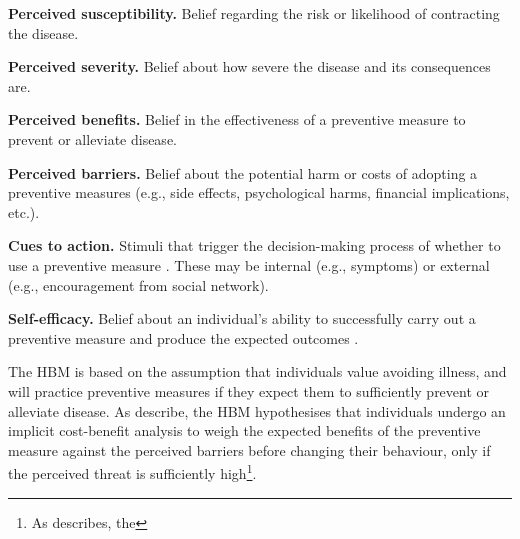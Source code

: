 \begin{description}
    \item \textbf{Perceived susceptibility.} Belief regarding the risk or likelihood of contracting the disease.
    \item \textbf{Perceived severity.} Belief about how severe the disease and its consequences are.
    \item \textbf{Perceived benefits.} Belief in the effectiveness of a preventive measure to prevent or alleviate disease.
    \item \textbf{Perceived barriers.} Belief about the potential harm or costs of adopting a preventive measures (e.g., side effects, psychological harms, financial implications, etc.).
    \item \textbf{Cues to action.} Stimuli that trigger the decision-making process of whether to use a preventive measure \cite{janz_health_1984}. These may be internal (e.g., symptoms) or external (e.g., encouragement from social network).
    \item \textbf{Self-efficacy.} Belief about an individual's ability to successfully carry out a preventive measure and produce the expected outcomes \cite{bandura_self-efficacy_1997}.
\end{description}

The HBM is based on the assumption that individuals value avoiding illness, and will practice preventive measures if they expect them to sufficiently prevent or alleviate disease. As \citet{champion_health_2015} describe, the HBM hypothesises that individuals undergo an implicit cost-benefit analysis to weigh the expected benefits of the preventive measure against the perceived barriers before changing their behaviour, only if the perceived threat is sufficiently high\footnote{As \citet{rosenstock_historical_1974} describes, the }.

